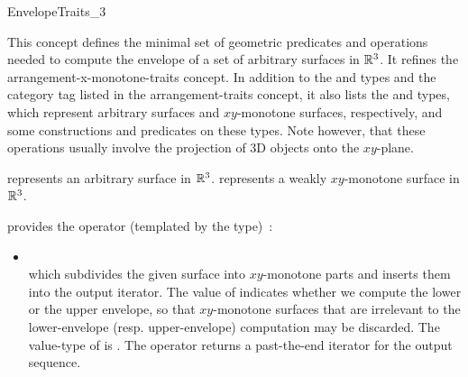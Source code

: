 \ccRefPageBegin

\begin{ccRefConcept}{EnvelopeTraits_3}

\ccDefinition

This concept defines the minimal set of geometric predicates and
operations needed to compute the envelope of a set of arbitrary
surfaces in $\mathbb{R}^3$. It refines the arrangement-x-monotone-traits 
concept. In addition to the  and  
types and the  category tag listed in the 
arrangement-traits concept, it also lists the  and 
 types, which represent arbitrary surfaces 
and $xy$-monotone surfaces, respectively, and some constructions and 
predicates on these types. Note however, that these operations usually 
involve the projection of 3D objects onto the $xy$-plane.

\ccRefines
{}

\ccTypes

{represents an arbitrary surface in $\mathbb{R}^3$.}
\ccGlue
{}
{represents a weakly $xy$-monotone surface in $\mathbb{R}^3$.}


\ccThreeToTwo

{provides the operator (templated by the  type)~:
 \begin{itemize}
 \item {} \\
 which subdivides the given surface  into $xy$-monotone parts
 and inserts them into the output iterator. The value of
  indicates whether we compute the lower or the upper
 envelope, so that $xy$-monotone surfaces that are irrelevant to the
 lower-envelope (resp. upper-envelope) computation may be discarded.
 The value-type of  is .
 The operator returns a past-the-end iterator for the output sequence.
 \end{itemize}}


\end{ccRefConcept}
